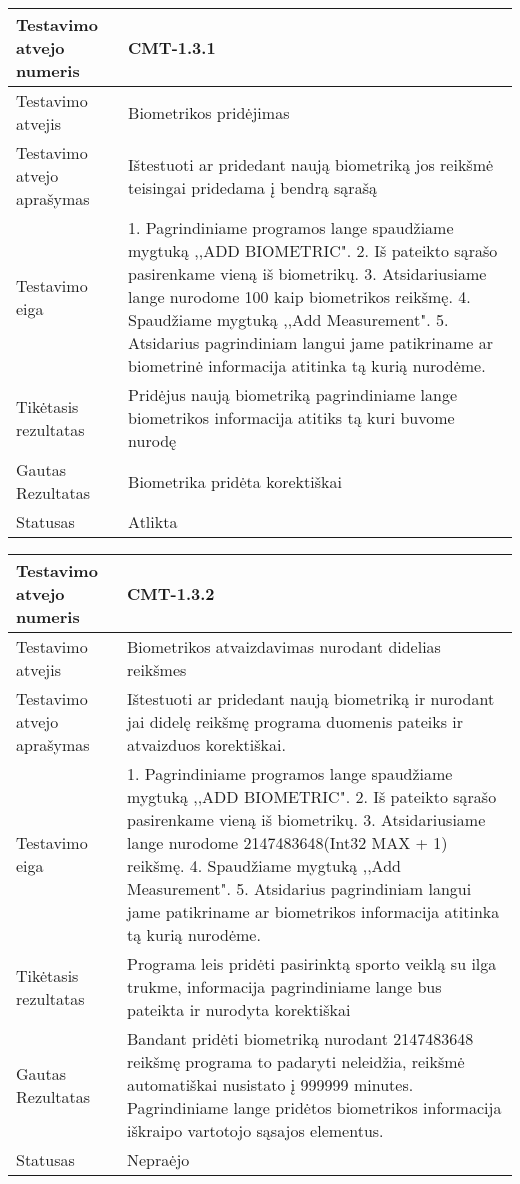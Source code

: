 \documentclass[oneside]{VUMIFPSkursinis}
\begin{document}
\iffalse XXXXXXXXXXXXXXXXXXXXXXXXXXXXXXXXXXXXXXXXXXXXXXXXXXXXXXXXXXXXXXXXXXXXXXXXXXXXXXXXXXXXXXXXXXXXXXXXXXXXXXXXXXXXXXXXXXXXXXXXXXXXXXXXXXXXXXX \fi
\begin{center}
    \begin{tabular}{ |p{5cm}|p{13cm}|}
    \hline
    	Testavimo atvejo numeris & CMT-1.3.1\\ \hline
    	Testavimo atvejis & Biometrikos pridėjimas \\ \hline
	Testavimo atvejo aprašymas & Ištestuoti ar pridedant naują biometriką jos reikšmė teisingai pridedama į bendrą sąrašą   \\ \hline
	Testavimo eiga &1. Pagrindiniame programos lange spaudžiame mygtuką ,,ADD BIOMETRIC". 
				2. Iš pateikto sąrašo pasirenkame vieną iš biometrikų. 
				3. Atsidariusiame lange nurodome 100 kaip biometrikos reikšmę.
				4. Spaudžiame mygtuką ,,Add Measurement".
				5. Atsidarius pagrindiniam langui jame patikriname ar biometrinė informacija atitinka tą kurią nurodėme.\\ \hline
	Tikėtasis rezultatas &  Pridėjus naują biometriką pagrindiniame lange biometrikos informacija atitiks tą kuri buvome nurodę\\ \hline
	Gautas Rezultatas & Biometrika pridėta korektiškai  \\ \hline
	Statusas &  Atlikta\\ \hline
    \hline
    \end{tabular}
\end{center}

\begin{center}
    \begin{tabular}{ |p{5cm}|p{13cm}|}
    \hline
    	Testavimo atvejo numeris & CMT-1.3.2  \\ \hline
    	Testavimo atvejis & Biometrikos atvaizdavimas nurodant didelias reikšmes  \\ \hline
	Testavimo atvejo aprašymas & Ištestuoti ar pridedant naują biometriką ir nurodant jai didelę reikšmę programa duomenis pateiks ir atvaizduos korektiškai.  \\ \hline
	Testavimo eiga & 1. Pagrindiniame programos lange spaudžiame mygtuką ,,ADD BIOMETRIC". 
				2. Iš pateikto sąrašo pasirenkame vieną iš biometrikų. 
				3. Atsidariusiame lange nurodome 2147483648(Int32 MAX + 1) reikšmę.
				4. Spaudžiame mygtuką ,,Add Measurement".
				5. Atsidarius pagrindiniam langui jame patikriname ar biometrikos informacija atitinka tą kurią nurodėme.\\ \hline
	Tikėtasis rezultatas & Programa leis pridėti pasirinktą sporto veiklą su ilga trukme, informacija pagrindiniame lange bus pateikta ir nurodyta korektiškai  \\ \hline
	Gautas Rezultatas & Bandant pridėti biometriką nurodant 2147483648 reikšmę programa to padaryti neleidžia, reikšmė automatiškai nusistato į 999999 minutes. Pagrindiniame lange pridėtos biometrikos informacija iškraipo vartotojo sąsajos elementus.  \\ \hline
	Statusas & Nepraėjo  \\ \hline
    \hline
    \end{tabular}
\end{center}
\end{document}
